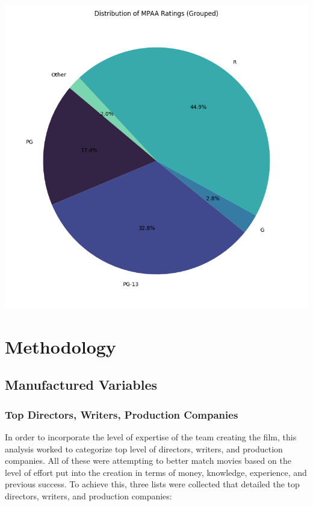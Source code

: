 \documentclass[
]{agujournal2019}
\begin{document}
\includegraphics{./notebooks/notebook_output/mpaa_pie.png}

\section{Methodology}\label{sec-meth}

\subsection{Manufactured Variables}\label{manufactured-variables}

\subsubsection{Top Directors, Writers, Production
Companies}\label{top-directors-writers-production-companies}

In order to incorporate the level of expertise of the team creating the
film, this analysis worked to categorize top level of directors,
writers, and production companies. All of these were attempting to
better match movies based on the level of effort put into the creation
in terms of money, knowledge, experience, and previous success. To
achieve this, three lists were collected that detailed the top
directors, writers, and production companies:
\end{document}
